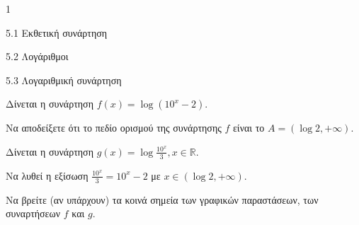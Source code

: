 \begin{ylh}{1}
\item 5.1 Εκθετική συνάρτηση
\item 5.2 Λογάριθμοι
\item 5.3 Λογαριθμική συνάρτηση
\end{ylh}
Δίνεται η συνάρτηση $f(x) = \log(10^x - 2)$.
\begin{alist}
\item Να αποδείξετε ότι το πεδίο ορισμού της συνάρτησης $f$ είναι το $A = (\log 2, +\infty)$.
\item Δίνεται η συνάρτηση $g(x) = \log\frac{10^x}{3}, x \in \mathbb{R}$.
\end{alist}
\begin{alist}
\item
  Να λυθεί η εξίσωση $\frac{10^x}{3} = 10^x - 2$ με $x \in (\log 2, +\infty)$.
\end{alist}
\begin{alist}
\item
  Να βρείτε (αν υπάρχουν) τα κοινά σημεία των γραφικών παραστάσεων, των συναρτήσεων $f$ και $g$.
\end{alist}

